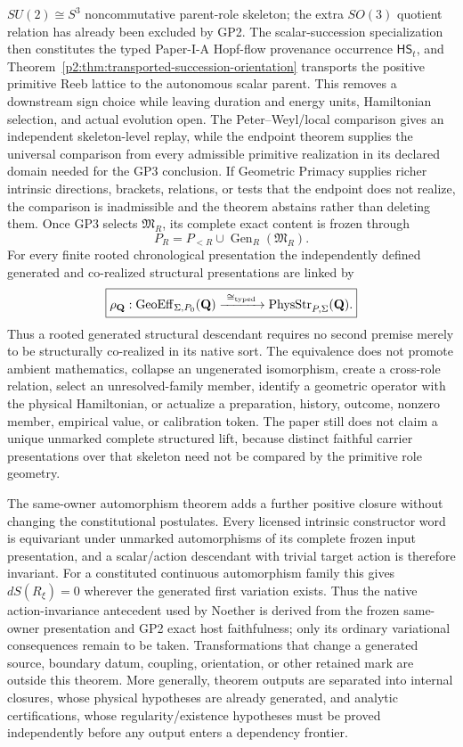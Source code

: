 \documentclass[12pt,a4paper]{article}
\begin{document}
\(SU(2)\cong S^3\) noncommutative parent-role skeleton; the extra
\(SO(3)\) quotient relation has already been excluded by GP2.  The
scalar-succession specialization then constitutes the typed
Paper-I-A Hopf-flow provenance occurrence
\(\mathsf{HS}_t\), and
Theorem~\ref{p2:thm:transported-succession-orientation} transports the
positive primitive Reeb lattice to the autonomous scalar parent.  This
removes a downstream sign choice while leaving duration and energy units,
Hamiltonian selection, and actual evolution open.  The
Peter--Weyl/local comparison gives an independent skeleton-level replay, while
the endpoint theorem supplies the universal comparison from every admissible
primitive realization in its declared domain needed for the GP3 conclusion.
If Geometric Primacy supplies richer intrinsic directions, brackets,
relations, or tests that the endpoint does not realize, the comparison is
inadmissible and the theorem abstains rather than deleting them.  Once GP3
selects \(\mathfrak M_R\), its complete exact content is frozen through
\[
 P_R=P_{<R}\cup\operatorname{Gen}_R(\mathfrak M_R).
\]
For every finite rooted chronological presentation the independently defined
generated and co-realized structural presentations are linked by
\[
 \boxed{
 \rho_{\mathbf Q}:
 \operatorname{GeoEff}_{\Sigma,P_0}(\mathbf Q)
 \xrightarrow{\ \cong_{\rm typed}\ }
 \operatorname{PhysStr}_{P,\Sigma}(\mathbf Q).}
\]
Thus a rooted generated structural descendant requires no second premise
merely to be structurally co-realized in its native sort.  The equivalence
does not promote ambient mathematics, collapse an ungenerated isomorphism,
create a cross-role relation, select an unresolved-family member, identify a
geometric operator with the physical Hamiltonian, or actualize a preparation,
history, outcome, nonzero member, empirical value, or calibration token.
The paper still does
not claim a unique unmarked complete structured lift, because distinct
faithful carrier presentations over that skeleton need not be compared by the
primitive role geometry.

The same-owner automorphism theorem adds a further positive closure without
changing the constitutional postulates.  Every licensed intrinsic constructor
word is equivariant under unmarked automorphisms of its complete frozen input
presentation, and a scalar/action descendant with trivial target action is
therefore invariant.  For a constituted continuous automorphism family this
gives \(dS(R_\xi)=0\) wherever the generated first variation exists.  Thus the
native action-invariance antecedent used by Noether is derived from the frozen
same-owner presentation and GP2 exact host faithfulness; only its ordinary
variational consequences remain to be taken.  Transformations that change a
generated source, boundary datum, coupling, orientation, or other retained
mark are outside this theorem.  More generally, theorem outputs are separated
into internal closures, whose physical hypotheses are already generated, and
analytic certifications, whose regularity/existence hypotheses must be proved
independently before any output enters a dependency frontier.
\end{document}
